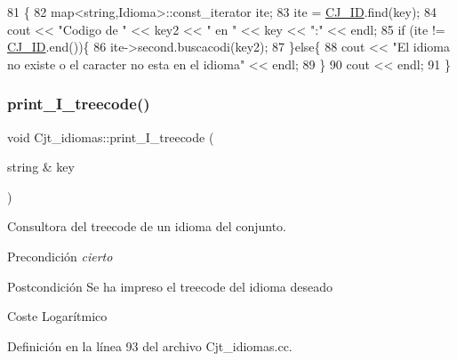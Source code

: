 \begin{DoxyCode}
81                                                       \{
82   map<string,Idioma>::const\_iterator ite;
83   ite = \hyperlink{class_cjt__idiomas_aeb67a7100b1345a160fb85466bd4e5f6}{CJ\_ID}.find(key);
84   cout << \textcolor{stringliteral}{"Codigo de "} << key2 << \textcolor{stringliteral}{" en "} << key << \textcolor{stringliteral}{":"} << endl;
85   \textcolor{keywordflow}{if} (ite != \hyperlink{class_cjt__idiomas_aeb67a7100b1345a160fb85466bd4e5f6}{CJ\_ID}.end())\{
86     ite->second.buscacodi(key2);
87   \}\textcolor{keywordflow}{else}\{
88     cout << \textcolor{stringliteral}{"El idioma no existe o el caracter no esta en el idioma"} << endl;
89   \}
90   cout << endl;
91 \}
\end{DoxyCode}
\mbox{\label{class_cjt__idiomas_abcb2442285737fae69096a5e05b9a594}} 
\subsubsection{\texorpdfstring{print\+\_\+\+I\+\_\+treecode()}{print\_I\_treecode()}}
{\footnotesize\ttfamily void Cjt\+\_\+idiomas\+::print\+\_\+\+I\+\_\+treecode (\begin{DoxyParamCaption}\item[{string \&}]{key }\end{DoxyParamCaption})}



Consultora del treecode de un idioma del conjunto. 

\begin{DoxyPrecond}{Precondición}
{\itshape cierto} 
\end{DoxyPrecond}
\begin{DoxyPostcond}{Postcondición}
Se ha impreso el treecode del idioma deseado 
\end{DoxyPostcond}
\begin{DoxyParagraph}{Coste}
Logarítmico 
\end{DoxyParagraph}


Definición en la línea 93 del archivo Cjt\+\_\+idiomas.\+cc.


